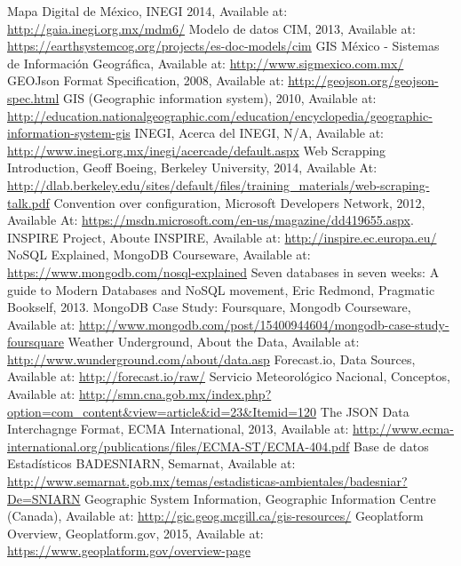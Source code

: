 \begin{thebibliography}{1}
		Mapa Digital de México, INEGI 2014, Available at: \url{http://gaia.inegi.org.mx/mdm6/}
	   Modelo de datos CIM, 2013, Available at: \url{https://earthsystemcog.org/projects/es-doc-models/cim}
		 GIS México - Sistemas de Información Geográfica, Available at: \url{http://www.sigmexico.com.mx/}
	     GEOJson Format Specification, 2008, Available at: \url{http://geojson.org/geojson-spec.html}
		 GIS (Geographic information system), 2010, Available at: \url{http://education.nationalgeographic.com/education/encyclopedia/geographic-information-system-gis}
		INEGI, Acerca del INEGI, N/A, Available at: \url{http://www.inegi.org.mx/inegi/acercade/default.aspx}
		Web Scrapping Introduction, Geoff Boeing, Berkeley University, 2014, Available At: \url{http://dlab.berkeley.edu/sites/default/files/training\_materials/web-scraping-talk.pdf}
		Convention over configuration, Microsoft Developers Network, 2012, Available At: \url{https://msdn.microsoft.com/en-us/magazine/dd419655.aspx}.
	    INSPIRE Project, Aboute INSPIRE, Available at: \url{http://inspire.ec.europa.eu/}
		NoSQL Explained, MongoDB Courseware, Available at: \url{https://www.mongodb.com/nosql-explained}
		Seven databases in seven weeks: A guide to Modern Databases and NoSQL movement, Eric Redmond, Pragmatic Bookself, 2013.
		MongoDB Case Study: Foursquare, Mongodb Courseware, Available at: \url{http://www.mongodb.com/post/15400944604/mongodb-case-study-foursquare}
		Weather Underground, About the Data, Available at: \url{http://www.wunderground.com/about/data.asp}
		Forecast.io, Data Sources, Available at: \url{http://forecast.io/raw/}
		Servicio Meteorológico Nacional, Conceptos, Available at: \url{http://smn.cna.gob.mx/index.php?option=com_content&view=article&id=23&Itemid=120}
    The JSON Data Interchagnge Format, ECMA International, 2013, Available at: \url{http://www.ecma-international.org/publications/files/ECMA-ST/ECMA-404.pdf}
    Base de datos Estadísticos BADESNIARN, Semarnat, Available at: \url{http://www.semarnat.gob.mx/temas/estadisticas-ambientales/badesniar?De=SNIARN}
    Geographic System Information, Geographic Information Centre (Canada), Available at: \url{http://gic.geog.mcgill.ca/gis-resources/}
    Geoplatform Overview, Geoplatform.gov, 2015, Available at:  \url{https://www.geoplatform.gov/overview-page}

\end{thebibliography}
